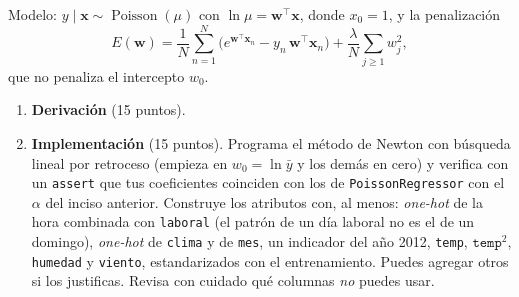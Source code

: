 \documentclass[11pt]{article}
\newcommand{\vx}{\mathbf{x}}
\newcommand{\vw}{\mathbf{w}}
\newcommand{\T}{^{\top}}
\newcommand{\ptsinc}[1]{{\unskip\nobreak\hfil\penalty50\hskip1em\hbox{}\nobreak\hfill(#1)\parfillskip=0pt\finalhyphendemerits=0\par}}
\begin{document}
\begin{enumerate}
Modelo: $y \mid \vx \sim \operatorname{Poisson}(\mu)$ con $\ln\mu = \vw\T\vx$, donde $x_0 = 1$, y la penalización
\[
E(\vw) = \frac1N\sum_{n=1}^N \Big(e^{\vw\T\vx_n} - y_n\,\vw\T\vx_n\Big) + \frac{\lambda}{N}\sum_{j \ge 1} w_j^2 ,
\]
que no penaliza el intercepto $w_0$.

\begin{enumerate}
  \item \textbf{Derivación} (15 puntos).

  \item \textbf{Implementación} (15 puntos). Programa el método de Newton con búsqueda lineal por retroceso (empieza en $w_0 = \ln\bar y$ y los demás en cero) y verifica con un \texttt{assert} que tus coeficientes coinciden con los de \texttt{PoissonRegressor} con el $\alpha$ del inciso anterior. Construye los atributos con, al menos: \emph{one-hot} de la hora combinada con \texttt{laboral} (el patrón de un día laboral no es el de un domingo), \emph{one-hot} de \texttt{clima} y de \texttt{mes}, un indicador del año 2012, \texttt{temp}, $\texttt{temp}^2$, \texttt{humedad} y \texttt{viento}, estandarizados con el entrenamiento. Puedes agregar otros si los justificas. Revisa con cuidado qué columnas \emph{no} puedes usar.


\end{enumerate}
\end{enumerate}
\end{document}
